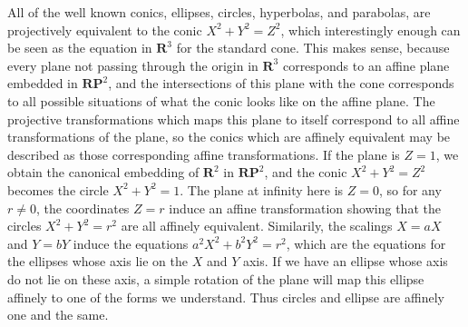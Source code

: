 All of the well known conics, ellipses, circles, hyperbolas, and parabolas, are projectively equivalent to the conic $X^2 + Y^2 = Z^2$, which interestingly enough can be seen as the equation in $\mathbf{R}^3$ for the standard cone. This makes sense, because every plane  not passing through the origin in $\mathbf{R}^3$ corresponds to an affine plane embedded in $\mathbf{RP}^2$, and the intersections of this plane with the cone corresponds to all possible situations of what the conic looks like on the affine plane. The projective transformations which maps this plane to itself correspond to all affine transformations of the plane, so the conics which are affinely equivalent may be described as those corresponding affine transformations. If the plane is $Z = 1$, we obtain the canonical embedding of $\mathbf{R}^2$ in $\mathbf{RP}^2$, and the conic $X^2 + Y^2 = Z^2$ becomes the circle $X^2 + Y^2 = 1$. The plane at infinity here is $Z = 0$, so for any $r \neq 0$, the coordinates $Z = r$ induce an affine transformation showing that the circles $X^2 + Y^2 = r^2$ are all affinely equivalent. Similarily, the scalings $X = aX$ and $Y = bY$ induce the equations $a^2X^2 + b^2Y^2 = r^2$, which are the equations for the ellipses whose axis lie on the $X$ and $Y$ axis. If we have an ellipse whose axis do not lie on these axis, a simple rotation of the plane will map this ellipse affinely to one of the forms we understand. Thus circles and ellipse are affinely one and the same.



